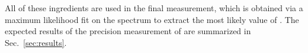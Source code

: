 All of these ingredients are used in the final measurement, which is obtained via a maximum likelihood fit on the \mfourl spectrum to extract the most likely value of \mH.
The expected results of the precision measurement of \mH are summarized in Sec.~\ref{sec:results}.






